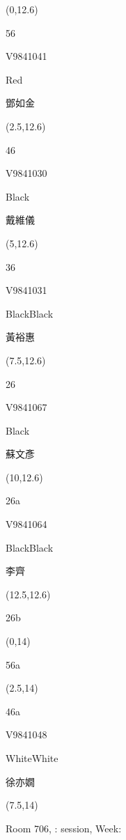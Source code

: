\documentclass[a4paper]{article}
\newcommand{\myseat}[5]{%
\vspace{-0.1cm}
\parbox[t][2.2cm][t]{3.5cm}{
\small #1 %
\begin{description}
\vspace{-0.1cm}
\item [ID:] #2
\vspace{-0.1cm}
\item [Team:] #3 \normalsize
\vspace{-0.1cm}
\item \normalsize #4 #5
\vspace{-0.1cm}
\end{description}
}
}
\begin{document}
\begin{CJK}{UTF8}{cyberbit}
\begin{textblock}{2.5}(0,12.6)
\myseat{56}{V9841041}{Red}{鄧如金}{}
\end{textblock}

\begin{textblock}{2.5}(2.5,12.6)
\myseat{46}{V9841030}{Black}{戴維儀}{}
\end{textblock}

\begin{textblock}{2.5}(5,12.6)
\myseat{36}{V9841031}{BlackBlack}{黃裕惠}{}
\end{textblock}

\begin{textblock}{2.5}(7.5,12.6)
\myseat{26}{V9841067}{Black}{蘇文彥}{}
\end{textblock}

\begin{textblock}{2.5}(10,12.6)
\myseat{26a}{V9841064}{BlackBlack}{李齊}{}
\end{textblock}

\begin{textblock}{2.5}(12.5,12.6)
\textblockcolor{}
\myseat{26b}{}{}{}{}
\end{textblock}

\begin{textblock}{2.5}(0,14)
\textblockcolor{}
\myseat{56a}{}{}{}{}
\end{textblock}

\begin{textblock}{2.5}(2.5,14)
\myseat{46a}{V9841048}{WhiteWhite}{徐亦嫺}{}
\end{textblock}

\begin{textblock}{7.5}(7.5,14)
\textblockcolor{}
\parbox[t][2.2cm][t]{9.5cm}{%
\large Room 706, :  session, Week: 
}
\end{textblock}

\end{CJK}
\end{document}
